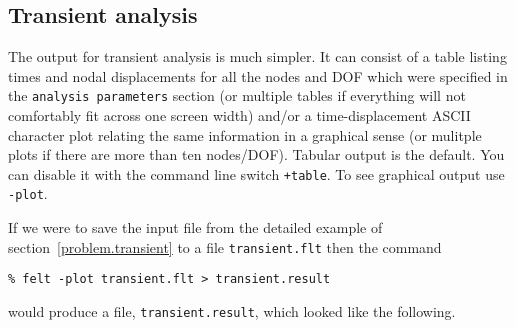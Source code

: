 \subsection{Transient analysis}

The output for transient analysis is much simpler.  It can consist of 
a table listing times and nodal displacements for all the nodes
and DOF which were specified in the \mbox{{\tt analysis parameters}}
section (or multiple tables if everything will not comfortably fit
across one screen width) and/or a time-displacement ASCII character
plot relating the same information in a graphical sense (or mulitple
plots if there are more than ten nodes/DOF).  Tabular output is the
default.  You can disable it with the command line switch {\tt +table}.
To see graphical output use {\tt -plot}.  

If we were to save the input file from the detailed example of 
section~\ref{problem.transient} to a file {\tt transient.flt} then the command
\begin{screen}
 \begin{verbatim}
% felt -plot transient.flt > transient.result
 \end{verbatim}
\end{screen}
would produce a file, {\tt transient.result}, which looked like the following.
